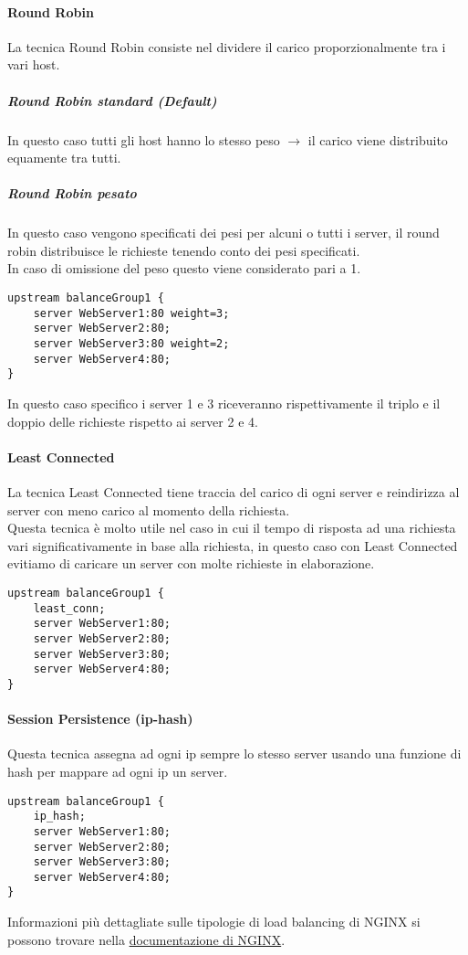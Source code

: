 \documentclass[../DocumentazioneProgetto.tex]{subfiles}
\begin{document}
	\paragraph{Round Robin}
	La tecnica Round Robin consiste nel dividere il carico proporzionalmente tra i vari host.
	\subparagraph{Round Robin standard (Default)} In questo caso tutti gli host hanno lo stesso peso \(\rightarrow \) il carico viene distribuito equamente tra tutti.
	\subparagraph{Round Robin pesato} In questo caso vengono specificati dei pesi per alcuni o tutti i server, il round robin distribuisce le richieste tenendo conto dei pesi specificati.\\
	In caso di omissione del peso questo viene considerato pari a 1.
	\begin{lstlisting}[caption=Round Robin pesato]
upstream balanceGroup1 {
	server WebServer1:80 weight=3;
	server WebServer2:80;
	server WebServer3:80 weight=2;
	server WebServer4:80;
}\end{lstlisting}
	In questo caso specifico i server 1 e 3 riceveranno rispettivamente il triplo e il doppio delle richieste rispetto ai server 2 e 4.
	\paragraph{Least Connected} La tecnica Least Connected tiene traccia del carico di ogni server e reindirizza al server con meno carico al momento della richiesta.\\
	Questa tecnica è molto utile nel caso in cui il tempo di risposta ad una richiesta vari significativamente in base alla richiesta, in questo caso con Least Connected
	evitiamo di caricare un server con molte richieste in elaborazione.
\begin{lstlisting}[caption=Least Connected]
upstream balanceGroup1 {
	least_conn;
	server WebServer1:80;
	server WebServer2:80;
	server WebServer3:80;
	server WebServer4:80;
}\end{lstlisting}
	\paragraph{Session Persistence (ip-hash)} Questa tecnica assegna ad ogni ip sempre lo stesso server usando una funzione di hash per mappare ad ogni ip un server.
\begin{lstlisting}[caption=Session Persistence]
upstream balanceGroup1 {
	ip_hash;
	server WebServer1:80;
	server WebServer2:80;
	server WebServer3:80;
	server WebServer4:80;
}\end{lstlisting}
	Informazioni più dettagliate sulle tipologie di load balancing di NGINX si possono trovare nella \href{https://nginx.org/en/docs/http/load_balancing.html}{documentazione di NGINX}.
\end{document}
